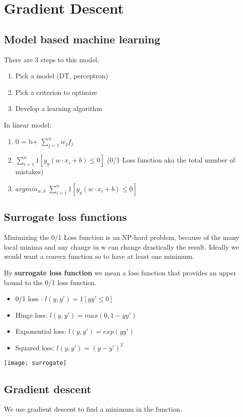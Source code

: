 
\chapter{Gradient Descent}
\section{Model based machine learning}
There are 3 steps to this model:
\begin{enumerate}
	\item Pick a model (DT, perceptron)
	\item Pick a criterion to optimize
	\item Develop a learning algorithm
\end{enumerate}

In linear model: 
\begin{enumerate}
	\item 0 = b+ $\sum_{j=1}^{n} w_jf_j$
	\item $\sum_{i=1}^{n}1[y_y(w\cdot x_i + b) \leq 0]$ (0/1 Loss function aka the total number of mistakes)
	\item $argmin_{w,b}$ $\sum_{i=1}^{n}1[y_y(w\cdot x_i + b) \leq 0]$
\end{enumerate}

\section{Surrogate loss functions}
Minimizing the 0/1 Loss function is an NP-hard problem, because of the many local minima and any change in w can change drastically the result. Ideally we would want a convex function so to have at least one minimum.

By \textbf{surrogate loss function} we mean a loss function that provides an upper bound to the 0/1 loss function. 

\begin{itemize}
	\item 0/1 loss : $l(y,y') = 1[yy'\leq 0]$
	\item Hinge loss: $l(y,y') = max(0,1-yy')$
	\item Exponential loss: $l(y,y') = exp(yy')$
	\item Squared loss: $l(y,y') = (y-y')^2$
\end{itemize}

\texttt{[image: surrogate]}

\section{Gradient descent}
We use gradient descent to find a minimum in the function. 

